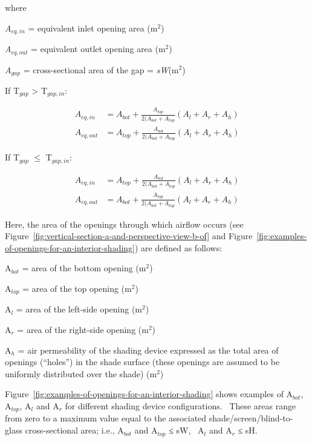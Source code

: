where

\emph{A\(_{eq,in}\)} = equivalent inlet opening area (m\(^{2}\))

\emph{A\(_{eq,out}\)} = equivalent outlet opening area (m\(^{2}\))

\emph{A\(_{gap}\)} = cross-sectional area of the gap = \emph{sW}(m\(^{2}\))

If T\(_{gap}\) \textgreater{} T\(_{gap,in}\):

\begin{equation}
  \begin{array}{rl}
    A_{eq,in}  & = A_{bot} + \frac{A_{top}}{2(A_{bot}+A_{top}} \left( A_l + A_r + A_h \right) \\
    A_{eq,out} & = A_{top} + \frac{A_{bot}}{2(A_{bot}+A_{top}} \left( A_l + A_r + A_h \right) 
  \end{array}
\end{equation}

If T\(_{gap}\) \(\leq\) T\(_{gap,in}\):

\begin{equation}
  \begin{array}{rl}
    A_{eq,in}  & = A_{top} + \frac{A_{bot}}{2(A_{bot}+A_{top}} \left( A_l + A_r + A_h \right) \\
    A_{eq,out} & = A_{bot} + \frac{A_{top}}{2(A_{bot}+A_{top}} \left( A_l + A_r + A_h \right) 
  \end{array}
\end{equation}

Here, the area of the openings through which airflow occurs (see Figure~\ref{fig:vertical-section-a-and-perspective-view-b-of} and Figure~\ref{fig:examples-of-openings-for-an-interior-shading}) are defined as follows:

A\(_{bot}\) = area of the bottom opening (m\(^{2}\))

A\(_{top}\) = area of the top opening (m\(^{2}\))

A\(_{l}\) = area of the left-side opening (m\(^{2}\))

A\(_{r}\) = area of the right-side opening (m\(^{2}\))

A\(_{h}\) = air permeability of the shading device expressed as the total area of openings (``holes'') in the shade surface (these openings are assumed to be uniformly distributed over the shade) (m\(^{2}\))

Figure~\ref{fig:examples-of-openings-for-an-interior-shading} shows examples of A\(_{bot}\), A\(_{top}\), A\(_{l}\) and A\(_{r}\) for different shading device configurations.~ These areas range from zero to a maximum value equal to the associated shade/screen/blind-to-glass cross-sectional area; i.e., A\(_{bot}\) and A\(_{top}\) ≤ sW,~ A\(_{l}\) and A\(_{r}\) ≤ sH.

